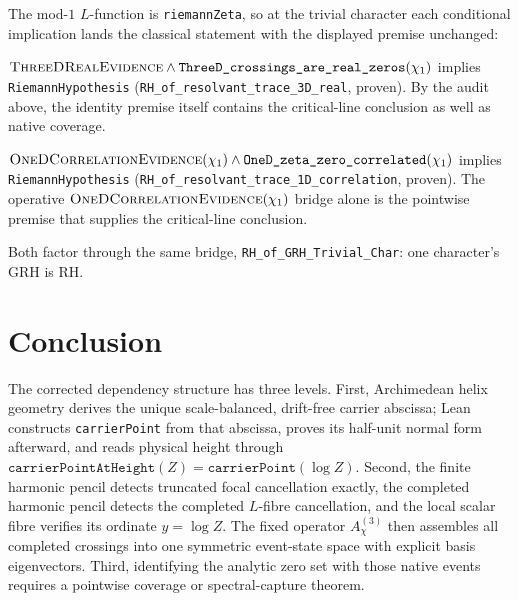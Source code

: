 The mod-\(1\) \(L\)-function is \texttt{riemannZeta}, so at the trivial
character each conditional implication lands the classical statement with
the displayed premise unchanged:

\begin{corollary}\label{cor:grh-rhA}
\(\textsc{ThreeDRealEvidence}\wedge
\texttt{ThreeD\_crossings\_are\_real\_zeros}(\chi_1)\)
implies \texttt{RiemannHypothesis}
(\texttt{RH\_of\_resolvant\_trace\_3D\_real}, proven).
By the audit above, the identity premise itself contains the
critical-line conclusion as well as native coverage.
\end{corollary}

\begin{corollary}\label{cor:grh-rhB}
\(\textsc{OneDCorrelationEvidence}(\chi_1)\wedge
\texttt{OneD\_zeta\_zero\_correlated}(\chi_1)\)
implies \texttt{RiemannHypothesis}
(\texttt{RH\_of\_resolvant\_trace\_1D\_correlation}, proven).
The operative \(\textsc{OneDCorrelationEvidence}(\chi_1)\) bridge alone is
the pointwise premise that supplies the critical-line conclusion.
\end{corollary}

Both factor through the same bridge, \texttt{RH\_of\_GRH\_Trivial\_Char}:
one character's GRH is RH.

\section{Conclusion}\label{sec:grh-conclusion}

The corrected dependency structure has three levels.  First, Archimedean
helix geometry derives the unique scale-balanced, drift-free carrier
abscissa; Lean constructs \texttt{carrierPoint} from that abscissa, proves
its half-unit normal form afterward, and reads physical height through
\(\texttt{carrierPointAtHeight}(Z)=\texttt{carrierPoint}(\log Z)\).  Second,
the finite harmonic pencil detects truncated focal cancellation exactly, the
completed harmonic pencil detects the completed \(L\)-fibre cancellation,
and the local scalar fibre verifies its ordinate \(y=\log Z\).  The fixed
operator \(A^{(3)}_\chi\) then assembles all completed crossings into one
symmetric event-state space with explicit basis eigenvectors.  Third,
identifying the analytic zero set with those native events requires a
pointwise coverage or spectral-capture theorem.

